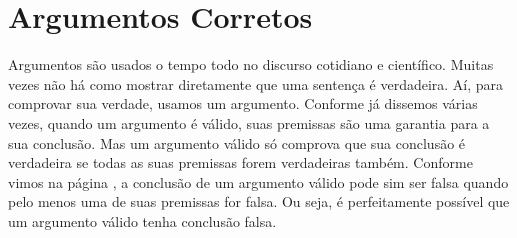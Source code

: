 

\section{Argumentos Corretos}
Argumentos são usados o tempo todo no discurso cotidiano e científico.
Muitas vezes não há como mostrar diretamente que uma sentença é verdadeira.
Aí, para comprovar sua verdade, usamos um argumento.
Conforme já dissemos várias vezes, quando um argumento é válido, suas premissas são uma garantia para a sua conclusão.
Mas um argumento válido só comprova que sua conclusão é verdadeira se todas as suas premissas forem verdadeiras também.
Conforme vimos na página \pageref{premissafalsa}, a conclusão de um argumento válido pode sim ser falsa quando pelo menos uma de suas premissas for falsa.
Ou seja, é perfeitamente possível que um argumento válido tenha conclusão falsa.

